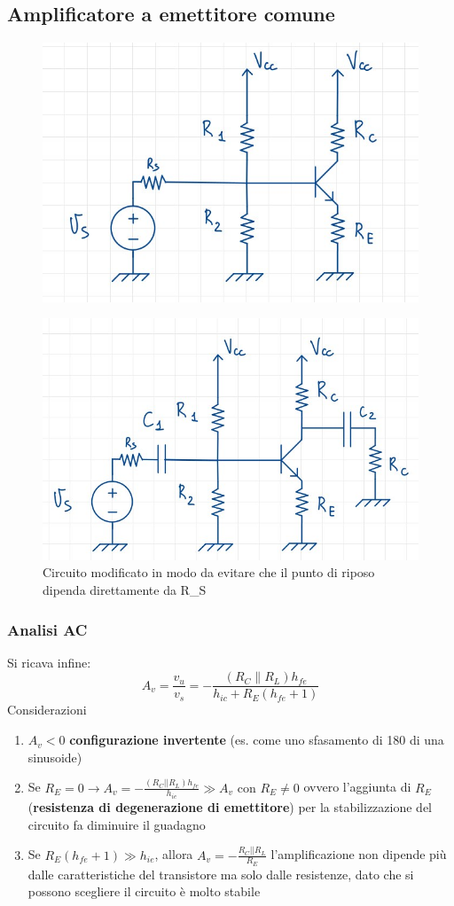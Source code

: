 \documentclass[11pt,a4paper,]{article}
\begin{document}
\subsection{Amplificatore a emettitore comune}
\begin{figure}[H]
    \centering
    \includegraphics[width=0.4\linewidth]{img/amp em com.png}
\end{figure}
\begin{figure}[H]
    \centering
    \includegraphics[width=0.4\linewidth]{img/amp comp com.png}
    \caption{Circuito modificato in modo da evitare che il punto di riposo dipenda direttamente da R\_S}
\end{figure}
\subsubsection{Analisi AC}
Si ricava infine:
\[
A_{v} = \frac{v_{u}}{v_{s}} = - \frac{(R_{C} \parallel R_{L}) h_{fe}}{h_{ic} + R_{E} (h_{fe} + 1)}
\]
\noindent Considerazioni
\begin{enumerate}
    \item $A_v<0$ \textbf{configurazione invertente} (es. come uno sfasamento di 180 di una sinusoide)
    \item Se $R_E = 0 \to A_v = -\frac{(R_C||R_L)h_{fe}}{h_{ie}} \gg A_v \text{ con } R_E \neq 0$ ovvero l'aggiunta di $R_E$ (\textbf{resistenza di degenerazione di emettitore}) per la stabilizzazione del circuito fa diminuire il guadagno
    \item Se $R_E(h_{fe}+1) \gg h_{ie}$, allora $A_v = -\frac{R_C||R_L}{R_E}$ l'amplificazione non dipende più dalle caratteristiche del transistore ma solo dalle resistenze, dato che si possono scegliere il circuito è molto stabile
\end{enumerate}
\end{document}
